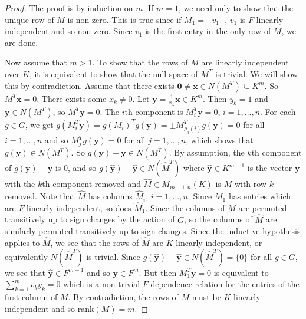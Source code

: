 \documentclass[12pt]{article}
\theoremstyle{plain}
\begin{document}
\begin{proof}
The proof is by induction on $m$. If $m = 1$, we need only to show
that the unique row of $M$ is non-zero. This is true since if $M_1 =
[v_1]$, $v_1$ is $F$ linearly independent and so non-zero. Since $v_1$
is the first entry in the only row of $M$, we are done.

Now assume that $m >1$. To show that the rows of $M$ are linearly
independent over $K$, it is equivalent to show that the null space of
$M^T$ is trivial. We will show this by contradiction. Assume that
there exists $\textbf{0} \neq \textbf{x} \in N(M^T) \subseteq K^m$. So
$M^T\textbf{x} = 0$. There exists some $x_k \neq 0$. Let $\textbf{y}=
\frac{1}{x_k}\textbf{x} \in K^m$. Then $y_k = 1$ and $\textbf{y}\in
N(M^T)$, so $M^T \textbf{y}=0$. The $i$th component is $M^T_i
\textbf{y}= 0 $, $i = 1, \ldots, n$. For each $g \in G$, we get
$g(M^T_i \textbf{y}) = g(M_i)^Tg(\textbf{y}) = \pm
M^T_{\rho_g(i)}g(\textbf{y}) = 0$ for all $i = 1, \ldots , n$ and so
$M^T_jg(\textbf{y}) = 0$ for all $j = 1, \ldots , n$, which shows that
$g(\textbf{y}) \in N(M^T)$. So $g(\textbf{y}) -\textbf{y} \in
N(M^T)$. By assumption, the $k$th component of $g(\textbf{y}) -
\textbf{y} $ is $0$, and so $g(\hat{\textbf{y}}) - \hat{\textbf{y}}\in
N(\hat{M}^T)$ where $\hat{\textbf{y}} \in K^{m-1}$ is the vector
$\textbf{y}$ with the $k$th component removed and $\hat{M} \in
M_{m-1,n}(K)$ is $M$ with row $k$ removed. Note that $\hat{M}$ has
columns $\hat{M}_i$, $i = 1, \ldots, n$. Since $M_1$ has entries which
are $F$-linearly independent, so does $\hat{M}_1$. Since the columns
of $M$ are permuted transitively up to sign changes by the action of
$G$, so the columns of $\hat{M}$ are similarly permuted transitively
up to sign changes. Since the inductive hypothesis applies to
$\hat{M}$, we see that the rows of $\hat{M}$ are $K$-linearly
independent, or equivalently $N(\hat{M}^T)$ is trivial. Since
$g(\hat{\textbf{y}}) -\hat{\textbf{y}} \in N(\hat{M}^T) = \lbrace 0
\rbrace$ for all $ g \in G$, we see that $\hat{\textbf{y}}\in F^{m-1}$
and so $\textbf{y} \in F^m$. But then $M^T_1 \textbf{y} = 0 $ is
equivalent to $\sum^m_{k = 1}v_ky_k = 0$ which is a non-trivial
$F$-dependence relation for the entries of the first column of $M$. By
contradiction, the rows of $M$ must be $K$-linearly independent and so
rank$(M) = m$.
 \end{proof} 
\end{document}
